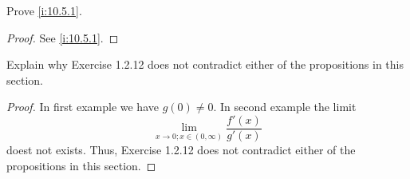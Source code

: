\exercisesection

\begin{ex}\label{i:ex:10.5.1}
  Prove \cref{i:10.5.1}.
\end{ex}

\begin{proof}
  See \cref{i:10.5.1}.
\end{proof}

\begin{ex}\label{i:ex:10.5.2}
  Explain why Exercise 1.2.12 does not contradict either of the propositions in this section.
\end{ex}

\begin{proof}
  In first example we have \(g(0) \neq 0\).
  In second example the limit
  \[
    \lim_{x \to 0 ; x \in (0, \infty)} \dfrac{f'(x)}{g'(x)}
  \]
  doest not exists.
  Thus, Exercise 1.2.12 does not contradict either of the propositions in this section.
\end{proof}
